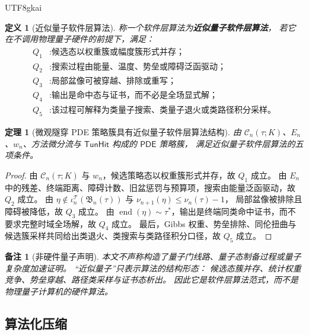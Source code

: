 \documentclass[12pt]{article}
\newtheorem{definition}{定义}[section]
\newtheorem{theorem}{定理}[section]
\newtheorem{remark}{备注}[section]
\newcommand{\PDE}{\mathsf{PDE}}
\newcommand{\TunHit}{\mathsf{TunHit}}
\newcommand{\Endp}{\operatorname{end}}
\begin{document}
\begin{CJK*}{UTF8}{gkai}
\begin{definition}[近似量子软件层算法]
称一个软件层算法为\textbf{近似量子软件层算法}，
若它在不调用物理量子硬件的前提下，满足：
\[
\begin{aligned}
  Q_1 &: \text{候选态以权重簇或幅度簇形式并存；}\\
  Q_2 &: \text{搜索过程由能量、温度、势垒或障碍泛函驱动；}\\
  Q_3 &: \text{局部盆像可被穿越、排除或重写；}\\
  Q_4 &: \text{输出是命中态与证书，而不必是全场显式解；}\\
  Q_5 &: \text{该过程可解释为类量子搜索、类量子退火或类路径积分采样。}
\end{aligned}
\]
\end{definition}

\begin{theorem}[微观隧穿 PDE 策略簇具有近似量子软件层算法结构]
\label{thm:tex53-quantum-like}
由 \(\mathcal C_n(\tau;K)\)、\(E_n\)、\(w_n\)、方法微分流与 \(\TunHit\) 构成的 \(\PDE\) 策略簇，
满足近似量子软件层算法的五项条件。
\end{theorem}

\begin{proof}
由 \(\mathcal C_n(\tau;K)\) 与 \(w_n\)，候选策略态以权重簇形式并存，故 \(Q_1\) 成立。
由 \(E_n\) 中的残差、终端距离、障碍计数、旧盆惩罚与预算项，搜索由能量泛函驱动，故 \(Q_2\) 成立。
由 \(\eta\notin\iota_n^{\mathcal T}(\mathfrak B_n(\tau))\) 与 \(\nu_{n+1}(\eta)\le\nu_n(\tau)-1\)，
局部盆像被排除且障碍被降低，故 \(Q_3\) 成立。
由 \(\Endp(\eta)\sim\tau^\ast\)，输出是终端同类命中证书，而不要求完整时域全场解，故 \(Q_4\) 成立。
最后，Gibbs 权重、势垒排除、同伦扭曲与候选簇采样共同给出类退火、类搜索与类路径积分口径，故 \(Q_5\) 成立。
\end{proof}

\begin{remark}[非硬件量子声明]
本文不声称构造了量子门线路、量子态制备过程或量子复杂度加速证明。
“近似量子”只表示算法的结构形态：
候选态簇并存、统计权重竞争、势垒穿越、路径类采样与证书态析出。
因此它是软件层算法范式，而不是物理量子计算机的硬件算法。
\end{remark}

\subsection{算法化压缩}
\label{subsec:tex53-algorithm}


\end{CJK*}
\end{document}
